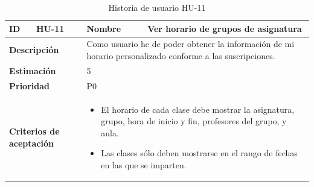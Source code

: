 \begin{table}[H]
    \centering
    \begin{tabular}{|p{2cm}|p{4cm}|p{2cm}|p{4cm}|}
        \hline
        \textbf{ID} & HU-11 & \textbf{Nombre} & Ver horario de grupos de asignatura \\
        \hline
        \multicolumn{2}{|p{6cm}|}{\textbf{Descripción}} & \multicolumn{2}{p{6cm}|}{Como usuario he de poder obtener la información de mi horario personalizado conforme a las suscripciones.} \\
        \hline
        \multicolumn{2}{|p{6cm}|}{\textbf{Estimación}} & \multicolumn{2}{p{6cm}|}{5} \\
        \hline
        \multicolumn{2}{|p{6cm}|}{\textbf{Prioridad}} & \multicolumn{2}{p{6cm}|}{P0} \\
        \hline
        \multicolumn{2}{|p{6cm}|}{\textbf{Criterios de aceptación}} & \multicolumn{2}{p{6cm}|}{
            \begin{itemize}
                \item El horario de cada clase debe mostrar la asignatura, grupo, hora de inicio y fin, profesores del grupo, y aula.
                \item Las clases sólo deben mostrarse en el rango de fechas en las que se imparten.
            \end{itemize}
        } \\
        \hline
    \end{tabular}
    \caption{Historia de usuario HU-11}
    \label{tab:hu_11}
\end{table}

